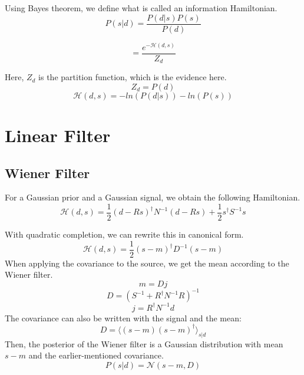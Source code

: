 Using Bayes theorem, we define what is called an information Hamiltonian.
\begin{equation}
    P(s|d) = \frac{P(d|s)P(s)}{P(d)}
\end{equation}
    
\begin{equation}
    = \frac{e^{-\mathcal{H}(d, s)}}{Z_d}
\end{equation}

Here, $Z_d$ is the partition function, which is the evidence here.
\begin{equation}
    Z_d = P(d)
\end{equation}
\begin{equation}
        \mathcal{H}(d, s) = -ln(P(d|s)) - ln(P(s))
\end{equation}

\section{Linear Filter}
\subsection{Wiener Filter}
For a Gaussian prior and a Gaussian signal, we obtain the following
Hamiltonian.
\begin{equation}
    \mathcal{H}(d, s) = \frac{1}{2}(d-Rs)^{\dagger}N^{-1}(d-Rs)+\frac{1}{2}s^{\dagger}S^{-1}s
\end{equation}

With quadratic completion, we can rewrite this in canonical form.
\begin{equation}
    \mathcal{H}(d, s) = \frac{1}{2}(s-m)^\dagger D^{-1}(s-m)
\end{equation}
When applying the covariance to the source, we get the mean according to the Wiener filter.
\begin{equation}
    m = Dj
\end{equation}
\begin{equation}
    D =(S^{-1}+R^{\dagger}N^{-1}R)^{-1}
\end{equation}
\begin{equation}
    j =R^{\dagger}N^{-1}d
\end{equation}
The covariance can also be written with the signal and the mean:
\begin{equation}
    D=\langle (s-m)(s-m)^\dagger \rangle_{s|d}
\end{equation}
Then, the posterior of the Wiener filter is a Gaussian distribution with mean $s-m$ and the earlier-mentioned covariance.
\begin{equation}
    P(s|d)=\mathcal{N}(s-m, D)
\end{equation}

